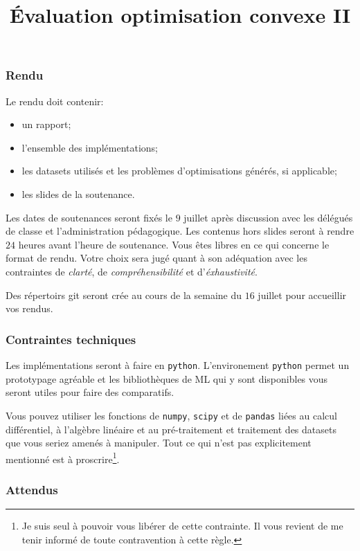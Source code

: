 \documentclass[11pt, a4paper]{article}
\title{%
  { \huge Évaluation optimisation convexe II}%
}
\author{}
\date{}
\begin{document}
\maketitle\thispagestyle{fancy}

\subsubsection*{Rendu}

Le rendu doit contenir:
\begin{itemize}
\item un rapport;
\item l'ensemble des implémentations;
\item les datasets utilisés et les problèmes d'optimisations générés, si applicable;
\item les slides de la soutenance.
\end{itemize}
Les dates de soutenances seront fixés le $9$ juillet après discussion
avec les délégués de classe et l'administration pédagogique. Les
contenus hors slides seront à rendre $24$ heures avant l'heure de
soutenance. Vous êtes libres en ce qui concerne le format de
rendu. Votre choix sera jugé quant à son adéquation avec les
contraintes de \emph{clarté}, de \emph{compréhensibilité} et
d'\emph{éxhaustivité}.

Des répertoirs git seront crée au cours de la semaine du $16$ juillet
pour accueillir vos rendus.

\subsubsection*{Contraintes techniques}

Les implémentations seront à faire en \texttt{python}. L'environement
\texttt{python} permet un prototypage agréable et les bibliothèques de
ML qui y sont disponibles vous seront utiles pour faire des
comparatifs.

Vous pouvez utiliser les fonctions de \texttt{numpy}, \texttt{scipy}
et de \texttt{pandas} liées au calcul différentiel, à l'algèbre
linéaire et au pré-traitement et traitement des datasets que vous
seriez amenés à manipuler. Tout ce qui n'est pas explicitement
mentionné est à proscrire\footnote{Je suis seul à pouvoir vous libérer
  de cette contrainte. Il vous revient de me tenir informé de toute
  contravention à cette règle.}.

\subsubsection*{Attendus}
\end{document}
